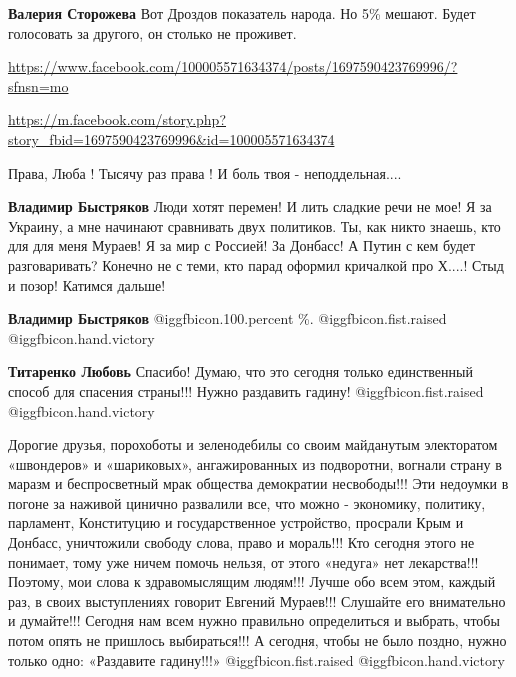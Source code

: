\begin{itemize}
\begin{itemize}
\textbf{Валерия Сторожева} Вот Дроздов показатель народа. Но 5\% мешают. Будет голосовать за другого, он столько не проживет.
\end{itemize} %

\url{https://www.facebook.com/100005571634374/posts/1697590423769996/?sfnsn=mo}

\url{https://m.facebook.com/story.php?story_fbid=1697590423769996&id=100005571634374}


Права, Люба ! Тысячу раз права ! И боль твоя - неподдельная....

\begin{itemize} %
\textbf{Владимир Быстряков} Люди хотят перемен! И лить сладкие речи не мое!
Я за Украину, а мне начинают сравнивать двух политиков.
Ты, как никто знаешь, кто для для меня Мураев!
Я за мир с Россией! За Донбасс!
А Путин с кем будет разговаривать? Конечно не с теми, кто парад оформил кричалкой про Х....! Стыд и позор! Катимся дальше!

\textbf{Владимир Быстряков}  @igg{fbicon.100.percent} \%.  @igg{fbicon.fist.raised} @igg{fbicon.hand.victory}

\textbf{Титаренко Любовь} Спасибо! Думаю, что это сегодня только единственный способ для спасения страны!!! Нужно раздавить гадину! @igg{fbicon.fist.raised} @igg{fbicon.hand.victory}
\end{itemize} %


Дорогие друзья, порохоботы и зеленодебилы со своим майданутым электоратом
«швондеров» и «шариковых», ангажированных из подворотни, вогнали страну в
маразм и беспросветный мрак общества демократии несвободы!!! Эти недоумки в
погоне за наживой цинично развалили все, что можно - экономику, политику,
парламент, Конституцию и государственное устройство, просрали Крым и Донбасс,
уничтожили свободу слова, право и мораль!!! Кто сегодня этого не понимает, тому
уже ничем помочь нельзя, от этого «недуга» нет лекарства!!! Поэтому, мои слова
к здравомыслящим людям!!! Лучше обо всем этом, каждый раз, в своих выступлениях
говорит Евгений Мураев!!! Слушайте его внимательно и думайте!!! Сегодня нам
всем нужно правильно определиться и выбрать, чтобы потом опять не пришлось
выбираться!!! А сегодня, чтобы не было поздно, нужно только одно: «Раздавите
гадину!!!»  @igg{fbicon.fist.raised}  @igg{fbicon.hand.victory}


\end{itemize}
